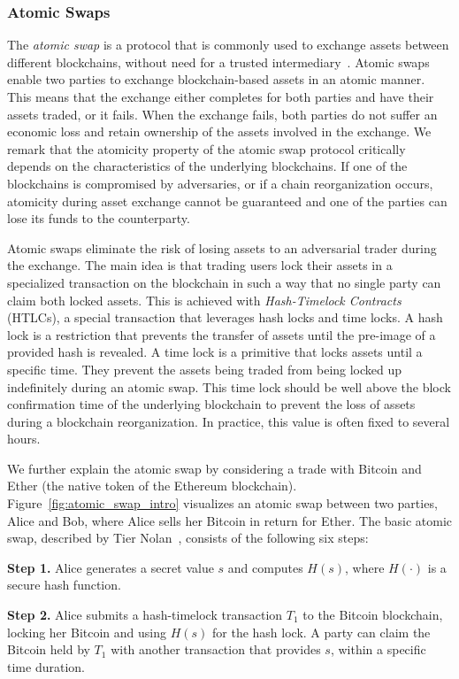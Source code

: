 \subsubsection{Atomic Swaps}
The \emph{atomic swap} is a protocol that is commonly used to exchange assets between different blockchains, without need for a trusted intermediary~\cite{herlihy2018atomic}.
Atomic swaps enable two parties to exchange blockchain-based assets in an atomic manner.
This means that the exchange either completes for both parties and have their assets traded, or it fails.
When the exchange fails, both parties do not suffer an economic loss and retain ownership of the assets involved in the exchange.
We remark that the atomicity property of the atomic swap protocol critically depends on the characteristics of the underlying blockchains.
If one of the blockchains is compromised by adversaries, or if a chain reorganization occurs, atomicity during asset exchange cannot be guaranteed and one of the parties can lose its funds to the counterparty.

Atomic swaps eliminate the risk of losing assets to an adversarial trader during the exchange.
The main idea is that trading users lock their assets in a specialized transaction on the blockchain in such a way that no single party can claim both locked assets.
This is achieved with \emph{Hash-Timelock Contracts} (HTLCs), a special transaction that leverages hash locks and time locks.
A hash lock is a restriction that prevents the transfer of assets until the pre-image of a provided hash is revealed.
A time lock is a primitive that locks assets until a specific time.
They prevent the assets being traded from being locked up indefinitely during an atomic swap.
This time lock should be well above the block confirmation time of the underlying blockchain to prevent the loss of assets during a blockchain reorganization.
In practice, this value is often fixed to several hours.

We further explain the atomic swap by considering a trade with Bitcoin and Ether (the native token of the Ethereum blockchain).
Figure~\ref{fig:atomic_swap_intro} visualizes an atomic swap between two parties, Alice and Bob, where Alice sells her Bitcoin in return for Ether.
The basic atomic swap, described by Tier Nolan~\cite{nolan2016atomic}, consists of the following six steps:

\textbf{Step 1.} Alice generates a secret value $ s $ and computes $ H(s) $, where $ H(\cdot) $ is a secure hash function.

\textbf{Step 2.} Alice submits a hash-timelock transaction $ T_1 $ to the Bitcoin blockchain, locking her Bitcoin and using $ H(s) $ for the hash lock. A party can claim the Bitcoin held by $ T_1 $ with another transaction that provides $ s $, within a specific time duration.

